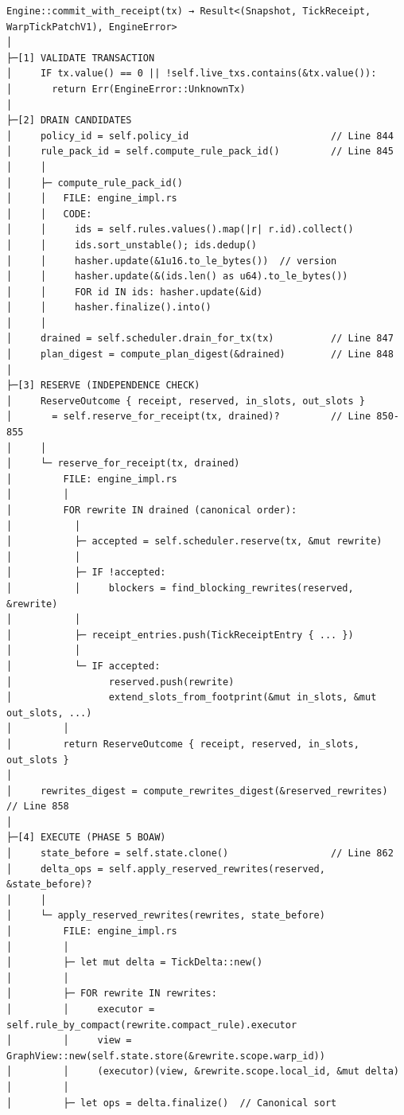 \documentclass[11pt]{book}
\begin{document}
\begin{verbatim}
Engine::commit_with_receipt(tx) → Result<(Snapshot, TickReceipt, WarpTickPatchV1), EngineError>
│
├─[1] VALIDATE TRANSACTION
│     IF tx.value() == 0 || !self.live_txs.contains(&tx.value()):
│       return Err(EngineError::UnknownTx)
│
├─[2] DRAIN CANDIDATES
│     policy_id = self.policy_id                         // Line 844
│     rule_pack_id = self.compute_rule_pack_id()         // Line 845
│     │
│     ├─ compute_rule_pack_id()
│     │   FILE: engine_impl.rs
│     │   CODE:
│     │     ids = self.rules.values().map(|r| r.id).collect()
│     │     ids.sort_unstable(); ids.dedup()
│     │     hasher.update(&1u16.to_le_bytes())  // version
│     │     hasher.update(&(ids.len() as u64).to_le_bytes())
│     │     FOR id IN ids: hasher.update(&id)
│     │     hasher.finalize().into()
│     │
│     drained = self.scheduler.drain_for_tx(tx)          // Line 847
│     plan_digest = compute_plan_digest(&drained)        // Line 848
│
├─[3] RESERVE (INDEPENDENCE CHECK)
│     ReserveOutcome { receipt, reserved, in_slots, out_slots }
│       = self.reserve_for_receipt(tx, drained)?         // Line 850-855
│     │
│     └─ reserve_for_receipt(tx, drained)
│         FILE: engine_impl.rs
│         │
│         FOR rewrite IN drained (canonical order):
│           │
│           ├─ accepted = self.scheduler.reserve(tx, &mut rewrite)
│           │
│           ├─ IF !accepted:
│           │     blockers = find_blocking_rewrites(reserved, &rewrite)
│           │
│           ├─ receipt_entries.push(TickReceiptEntry { ... })
│           │
│           └─ IF accepted:
│                 reserved.push(rewrite)
│                 extend_slots_from_footprint(&mut in_slots, &mut out_slots, ...)
│         │
│         return ReserveOutcome { receipt, reserved, in_slots, out_slots }
│
│     rewrites_digest = compute_rewrites_digest(&reserved_rewrites)  // Line 858
│
├─[4] EXECUTE (PHASE 5 BOAW)
│     state_before = self.state.clone()                  // Line 862
│     delta_ops = self.apply_reserved_rewrites(reserved, &state_before)?
│     │
│     └─ apply_reserved_rewrites(rewrites, state_before)
│         FILE: engine_impl.rs
│         │
│         ├─ let mut delta = TickDelta::new()
│         │
│         ├─ FOR rewrite IN rewrites:
│         │     executor = self.rule_by_compact(rewrite.compact_rule).executor
│         │     view = GraphView::new(self.state.store(&rewrite.scope.warp_id))
│         │     (executor)(view, &rewrite.scope.local_id, &mut delta)
│         │
│         ├─ let ops = delta.finalize()  // Canonical sort

\end{verbatim}
\end{document}
